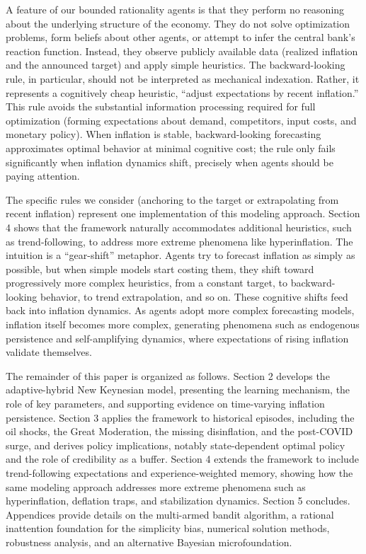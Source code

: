 \documentclass[10pt]{article}
\begin{document}
A feature of our bounded rationality agents is that they perform no reasoning about the underlying structure of the economy. They do not solve optimization problems, form beliefs about other agents, or attempt to infer the central bank's reaction function. Instead, they observe publicly available data (realized inflation and the announced target) and apply simple heuristics. The backward-looking rule, in particular, should not be interpreted as mechanical indexation. Rather, it represents a cognitively cheap heuristic, ``adjust expectations by recent inflation.'' This rule avoids the substantial information processing required for full optimization (forming expectations about demand, competitors, input costs, and monetary policy). When inflation is stable, backward-looking forecasting approximates optimal behavior at minimal cognitive cost; the rule only fails significantly when inflation dynamics shift, precisely when agents should be paying attention.

The specific rules we consider (anchoring to the target or extrapolating from recent inflation) represent one implementation of this modeling approach. Section 4 shows that the framework naturally accommodates additional heuristics, such as trend-following, to address more extreme phenomena like hyperinflation. The intuition is a ``gear-shift'' metaphor. Agents try to forecast inflation as simply as possible, but when simple models start costing them, they shift toward progressively more complex heuristics, from a constant target, to backward-looking behavior, to trend extrapolation, and so on. These cognitive shifts feed back into inflation dynamics. As agents adopt more complex forecasting models, inflation itself becomes more complex, generating phenomena such as endogenous persistence and self-amplifying dynamics, where expectations of rising inflation validate themselves.

The remainder of this paper is organized as follows. Section 2 develops the adaptive-hybrid New Keynesian model, presenting the learning mechanism, the role of key parameters, and supporting evidence on time-varying inflation persistence. Section 3 applies the framework to historical episodes, including the oil shocks, the Great Moderation, the missing disinflation, and the post-COVID surge, and derives policy implications, notably state-dependent optimal policy and the role of credibility as a buffer. Section 4 extends the framework to include trend-following expectations and experience-weighted memory, showing how the same modeling approach addresses more extreme phenomena such as hyperinflation, deflation traps, and stabilization dynamics. Section 5 concludes. Appendices provide details on the multi-armed bandit algorithm, a rational inattention foundation for the simplicity bias, numerical solution methods, robustness analysis, and an alternative Bayesian microfoundation.
\end{document}
